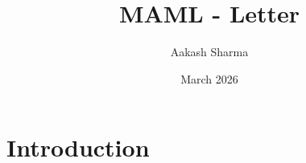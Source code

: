 \documentclass{article}
\title{MAML - Letter}
\author{Aakash Sharma}
\date{March 2026}
\begin{document}
\maketitle

\section{Introduction}
\end{document}
